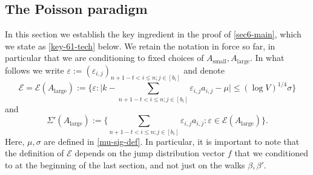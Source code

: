 \documentclass[11pt,reqno]{amsart}
\numberwithin{equation}{section}
\theoremstyle{definition}
\theoremstyle{remark}
\newcommand{\eps}{\varepsilon}
\renewcommand{\le}{\leqslant}
\def\sml{\operatorname{small}}
\def\lrg{\operatorname{large}}
\begin{document}
\subsection{The Poisson paradigm} In this section we establish the key ingredient in the proof of \cref{sec6-main}, which we state as \cref{key-61-tech} below. We retain the notation in force so far, in particular that we are conditioning to fixed choices of $A_{\sml}, A_{\lrg}$. In what follows we write $\eps:= (\eps_{i,j})_{n +1 - t < i \le n;j \in [b_i]}$ and denote 
\begin{equation}\label{e-alarge-def} \mathcal{E} = \mathcal{E}(A_{\lrg}) := \big\{ \eps : \big| k - \sum_{n +1 - t < i \le n;j \in [b_i]} \eps_{i,j} a_{i,j} - \mu\big| \le (\log V)^{1/4} \sigma \big\} \end{equation} and
\[ \Sigma'(A_{\lrg}) := \{ \sum_{n + 1 - t < i \le n;j \in [b_i]} \eps_{i,j} a_{i,j} : \eps  \in \mathcal{E}(A_{\lrg})\}.\]
Here, $\mu, \sigma$ are defined in \cref{mu-sig-def}. In particular, it is important to note that the definition of $\mathcal{E}$ depends on the jump distribution vector $f$ that we conditioned to at the beginning of the last section, and not just on the walks $\beta,\beta'$.
\end{document}
